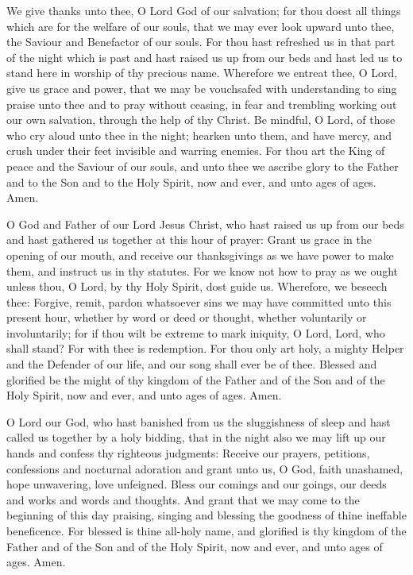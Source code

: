  We give thanks unto thee, O Lord God of our salvation; for thou doest all things which are for the welfare of our souls, that we may ever look upward unto thee, the Saviour and Benefactor of our souls. For thou hast refreshed us in that part of the night which is past and hast raised us up from our beds and hast led us to stand here in worship of thy precious name. Wherefore we entreat thee, O Lord, give us grace and power, that we may be vouchsafed with understanding to sing praise unto thee and to pray without ceasing, in fear and trembling working out our own salvation, through the help of thy Christ. Be mindful, O Lord, of those who cry aloud unto thee in the night; hearken unto them, and have mercy, and crush under their feet invisible and warring enemies. For thou art the King of peace and the Saviour of our souls, and unto thee we ascribe glory to the Father and to the Son and to the Holy Spirit, now and ever, and unto ages of ages. Amen.

 O God and Father of our Lord Jesus Christ, who hast raised us up from our beds and hast gathered us together at this hour of prayer: Grant us grace in the opening of our mouth, and receive our thanksgivings as we have power to make them, and instruct us in thy statutes. For we know not how to pray as we ought unless thou, O Lord, by thy Holy Spirit, dost guide us. Wherefore, we beseech thee: Forgive, remit, pardon whatsoever sins we may have committed unto this present hour, whether by word or deed or thought, whether voluntarily or involuntarily; for if thou wilt be extreme to mark iniquity, O Lord, Lord, who shall stand? For with thee is redemption. For thou only art holy, a mighty Helper and the Defender of our life, and our song shall ever be of thee. Blessed and glorified be the might of thy kingdom of the Father and of the Son and of the Holy Spirit, now and ever, and unto ages of ages. Amen.

 O Lord our God, who hast banished from us the sluggishness of sleep and hast called us together by a holy bidding, that in the night also we may lift up our hands and confess thy righteous judgments: Receive our prayers, petitions, confessions and nocturnal adoration and grant unto us, O God, faith unashamed, hope unwavering, love unfeigned. Bless our comings and our goings, our deeds and works and words and thoughts. And grant that we may come to the beginning of this day praising, singing and blessing the goodness of thine ineffable beneficence. For blessed is thine all-holy name, and glorified is thy kingdom of the Father and of the Son and of the Holy Spirit, now and ever, and unto ages of ages. Amen.

